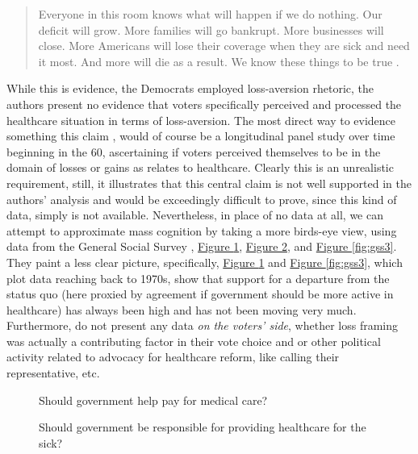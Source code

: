 \documentclass[11pt]{article}
\begin{document}
\begin{quote}
  Everyone in this room knows what will happen if we do nothing. Our deficit will grow. More families will go bankrupt. More businesses will close. More Americans will lose their coverage when they are sick and need it most. And more will die as a result. We know these things to be true \parencite[][]{Obama2009}.
\end{quote}

While this is evidence, the Democrats employed loss-aversion rhetoric, the authors present no evidence that voters specifically perceived and processed the healthcare situation in terms of loss-aversion. The most direct way to evidence something this claim , would of course be a longitudinal panel study over time beginning in the 60, ascertaining if voters perceived themselves to be in the domain of losses or gains as relates to healthcare. Clearly this is an unrealistic requirement, still, it illustrates that this central claim is not well supported in the authors' analysis and would be exceedingly difficult to prove, since this kind of data, simply is not available. Nevertheless, in place of no data at all, we can attempt to approximate mass cognition by taking a more birds-eye view, using data from the General Social Survey \parencite[][]{GSS}, \hyperref[fig:gss1]{Figure \ref*{fig:gss1}}, \hyperref[fig:gss2]{Figure \ref*{fig:gss2}}, and \hyperref[fig:gss3]{Figure \ref*{fig:gss3}}. They paint a less clear picture, specifically, \hyperref[fig:gss1]{Figure \ref*{fig:gss1}} and \hyperref[fig:gss3]{Figure \ref*{fig:gss3}}, which plot data reaching back to 1970s, show that support for a departure from the status quo (here proxied by agreement if government should be more active in healthcare) has always been high and has not been moving very much. Furthermore, \textcite[][]{Jacobs2014} do not present any data \textit{on the voters' side}, whether loss framing was actually a contributing factor in their vote choice and or other political activity related to advocacy for healthcare reform, like calling their representative, etc.

\begin{figure}[!ht]
  \sffamily
  \caption{Should government help pay for medical care?}
  
  \label{fig:gss1}
\end{figure}

\begin{figure}[!ht]
  \sffamily
  \caption{Should government be responsible for providing healthcare for the sick?}
  
  \label{fig:gss2}
\end{figure}
\end{document}
